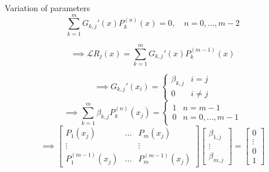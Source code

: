 \documentclass{beamer}
\begin{document}
\begin{frame}
\begin{block}{Variation of parameters}
\begin{equation*}
\sum_{k=1}^m G_{k,j}'(x) P_k^{(n)}(x) = 0, \quad n = 0,...,m-2
\end{equation*}
\end{block}
\begin{equation*}
\implies \mathcal{L} R_j(x) = \sum_{k=1}^m G_{k,j}'(x) P_k^{(m-1)}(x)
\end{equation*}
\end{frame}

\begin{frame}
\begin{equation*}
\implies G_{k,j}'(x_i) = \begin{cases} \beta_{k,j} & i = j \\ 0 & i \neq j \end{cases}
\end{equation*}
\begin{equation*}
\implies \sum_{k=1}^m \beta_{k,j} P_k^{(n)}(x_j) = \begin{cases} 1 & n = m-1 \\ 0 & n = 0,...,m-1 \end{cases}
\end{equation*}
\begin{equation*}
\implies \begin{bmatrix} P_1(x_j) & \dots & P_m(x_j) \\ \vdots & & \vdots \\ P_1^{(m-1)}(x_j) & \dots & P_m^{(m-1)}(x_j) \end{bmatrix} \begin{bmatrix} \beta_{1,j} \\ \vdots \\ \beta_{m,j} \end{bmatrix} = \begin{bmatrix} 0 \\ \vdots \\ 0 \\ 1 \end{bmatrix}
\end{equation*}
\end{frame}
\end{document}

